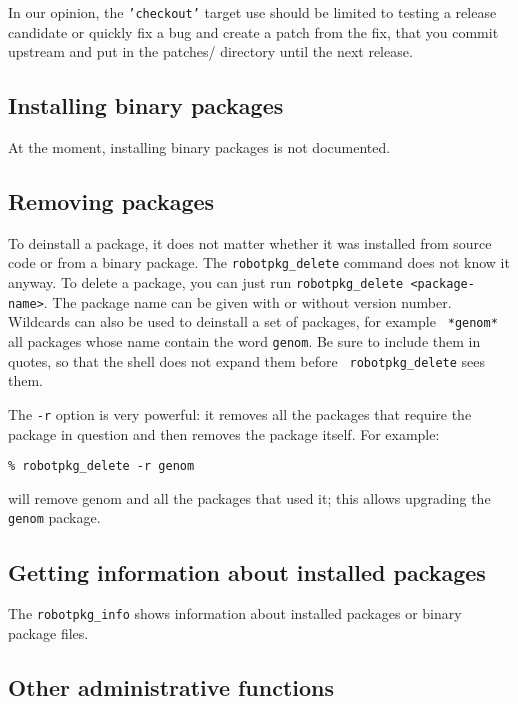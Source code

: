 In our opinion, the {\tt 'checkout'}  target use should be limited to testing a
release candidate or  quickly fix a bug  and create a patch from  the fix, that
you commit upstream and put in the patches/ directory until the next release.


\subsection{Installing binary packages} %

At the moment, installing binary packages is not documented.

\subsection{Removing packages} %

To deinstall a package, it does not matter whether it was installed from source
code or  from a  binary package.  The  {\tt robotpkg\_delete} command  does not
know it  anyway.  To delete a  package, you can just  run {\tt robotpkg\_delete
<package-name>}.  The package name can be given with or without version number.
Wildcards can  also be used  to deinstall a  set of packages, for  example {\tt
*genom*} all  packages whose  name contain  the word {\tt  genom}.  Be  sure to
include them  in quotes,  so that the  shell does  not expand them  before {\tt
robotpkg\_delete} sees them.

The {\tt -r} option is very powerful: it  removes all the packages that require
the package in question and then removes the package itself. For example:

\begin{verbatim}
% robotpkg_delete -r genom
\end{verbatim}

will remove genom and all the packages that used it; this allows
upgrading the {\tt genom} package.

\subsection{Getting information about installed packages} %

The {\tt  robotpkg\_info} shows information about installed  packages or binary
package files.


\subsection{Other administrative functions} %

